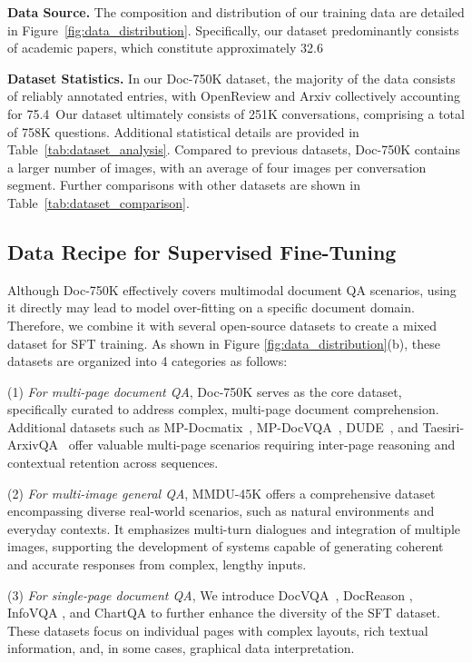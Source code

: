 \documentclass[10pt,twocolumn,letterpaper]{article}
\def\dataname{Doc-750K\xspace}
\begin{document}
\begin{CJK}{UTF8}{gbsn}
\textbf{Data Source.} 
The composition and distribution of our training data are detailed in Figure~\ref{fig:data_distribution}. Specifically, our dataset predominantly consists of academic papers, which constitute approximately 32.6\

\noindent\textbf{Dataset Statistics.}
In our {\dataname} dataset, the majority of the data consists of reliably annotated entries, with OpenReview and Arxiv collectively accounting for 75.4\
Our dataset ultimately consists of 251K conversations, comprising a total of 758K questions. Additional statistical details are provided in Table~\ref{tab:dataset_analysis}. Compared to previous datasets, {\dataname} contains a larger number of images, with an average of four images per conversation segment. Further comparisons with other datasets are shown in Table~\ref{tab:dataset_comparison}.




\subsection{Data Recipe for Supervised Fine-Tuning}

Although \dataname effectively covers multimodal document QA scenarios, using it directly may lead to model over-fitting on a specific document domain. Therefore, we combine it with several open-source datasets to create a mixed dataset for SFT training.
As shown in Figure \ref{fig:data_distribution}(b), these datasets are organized into 4 categories as follows:

 (1) \emph{For multi-page document QA}, \dataname serves as the core dataset, specifically curated to address complex, multi-page document comprehension. Additional datasets such as MP-Docmatix~\cite{laurenccon2024docmatix}, MP-DocVQA~\cite{mathew2021docvqa}, DUDE~\cite{van2023document}, and Taesiri-ArxivQA~\cite{arxivqa}
offer valuable multi-page scenarios requiring inter-page reasoning and contextual retention across sequences. 

 (2) \emph{For multi-image general QA}, MMDU-45K \cite{liu2024mmdu} offers a comprehensive dataset encompassing diverse real-world scenarios, such as natural environments and everyday contexts. It emphasizes multi-turn dialogues and integration of multiple images, supporting the development of systems capable of generating coherent and accurate responses from complex, lengthy inputs.

(3) \emph{For single-page document QA}, We introduce DocVQA~\cite{mathew2021docvqa}, DocReason \cite{ye2023mplugdocowl}, InfoVQA \cite{mathew2022infographicvqa}, and ChartQA \cite{masry2022chartqa} to further enhance the diversity of the SFT dataset.
These datasets focus on individual pages with complex layouts, rich textual information, and, in some cases, graphical data interpretation.


\end{CJK}
\end{document}
